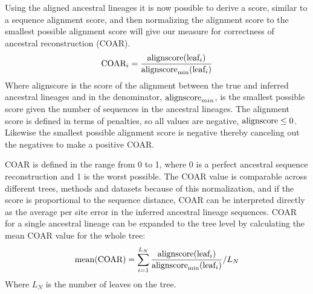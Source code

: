 

Using the aligned ancestral lineages it is now possible to derive a score, similar to a sequence alignment score, and then normalizing the alignment score to the smallest possible alignment score will give our measure for correctness of ancestral reconstruction (COAR).
$$
\text{COAR}_i = \frac{\text{alignscore}(\text{leaf}_i)}{\text{alignscore}_{\min}(\text{leaf}_i)}
$$
Where alignscore is the score of the alignment between the true and inferred ancestral lineages and in the denominator, $\text{alignscore}_{min}$, is the smallest possible score given the number of sequences in the ancestral lineages.
The alignment score is defined in terms of penalties, so all values are negative, $\text{alignscore} \leq 0$.
Likewise the smallest possible alignment score is negative thereby canceling out the negatives to make a positive COAR.

COAR is defined in the range from 0 to 1, where 0 is a perfect ancestral sequence reconstruction and 1 is the worst possible.
The COAR value is comparable across different trees, methods and datasets because of this normalization, and if the score is proportional to the sequence distance, COAR can be interpreted directly as the average per site error in the inferred ancestral lineage sequences.
COAR for a single ancestral lineage can be expanded to the tree level by calculating the mean COAR value for the whole tree:
$$
\operatorname{mean}(\text{COAR}) = \sum^{L_N}_{i=1} \frac{\text{alignscore}(\text{leaf}_i)}{\text{alignscore}_{\min}(\text{leaf}_i)} / L_N
$$
Where $L_N$ is the number of leaves on the tree.




